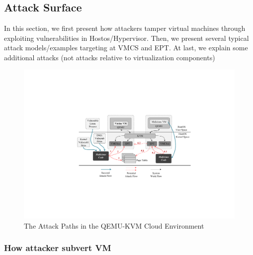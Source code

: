 \subsection{Attack Surface}\label{sub:attacksurface}

In this section, we first present how attackers tamper virtual machines through exploiting vulnerabilities in Hostos/Hypervisor. Then, we present several typical attack models/examples targeting at VMCS and EPT. At last, we explain some additional attacks (not attacks relative to virtualization components)

\begin{figure}[htpb]
    \centering
    \includegraphics[width=1\linewidth]{IMG/threat.pdf}
    \caption{The Attack Paths in the QEMU-KVM Cloud Environment}%
    \label{fig:threat}
\end{figure}


\subsubsection{How attacker subvert VM}

